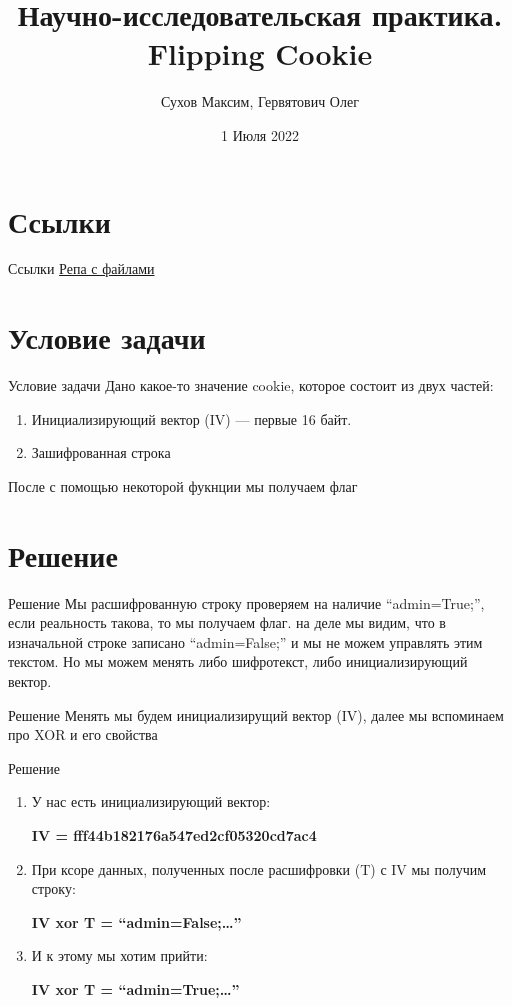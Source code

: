 \documentclass[12pt]{beamer}
\title{Научно-исследовательская практика. Flipping Cookie}
\author{Сухов Максим, Гервятович Олег}
\date{1 Июля 2022}
\begin{document}
\begin{titlepage}
       
\end{titlepage}
\section{Ссылки}
\begin{frame}{Ссылки}
     \href{https://github.com/ogerv/praktika}{Репа с файлами}
\end{frame}
\section{Условие задачи}
\begin{frame}{Условие задачи}
    Дано какое-то значение cookie, которое состоит из двух частей:
    \begin{enumerate}
        \item Инициализирующий вектор (IV) — первые 16 байт.
        \item Зашифрованная строка 
    \end{enumerate}  
    После с помощью некоторой фукнции мы получаем флаг  
\end{frame}

\section{Решение}
\begin{frame}{Решение}
    Мы расшифрованную строку проверяем на наличие “admin=True;”, если реальность такова, то мы получаем флаг.
     на деле мы видим, что в изначальной строке записано “admin=False;” и мы не можем управлять этим текстом. Но мы можем менять либо шифротекст, либо инициализирующий вектор.
\end{frame}

\begin{frame}{Решение}
    Менять мы будем инициализирущий вектор (IV), далее мы вспоминаем про XOR и его свойства
\end{frame}

\begin{frame}{Решение}
  \begin{enumerate}
        \item У нас есть инициализирующий вектор:
        \par\textbf{IV = fff44b182176a547ed2cf05320cd7ac4}
        \item При ксоре данных, полученных после расшифровки (T) с IV мы получим строку:
        \par\textbf{IV xor T = “admin=False;…”}
        \item И к этому мы хотим прийти:
        \par\textbf{IV xor T = “admin=True;…”}
    \end{enumerate}  
\end{frame}
\end{document}
